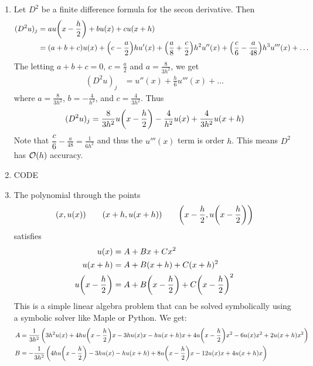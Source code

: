 \documentclass{article} %
\theoremstyle{plain}
\numberwithin{equation}{section} %
\numberwithin{figure}{section} %
\numberwithin{table}{section} %
\begin{document}
\begin{enumerate}[\ \ (a)]
    \item
        Let $D^2$ be a finite difference formula for the secon derivative.  Then
        \begin{align}
            (D^2u)_j &= au\qty(x - \frac{h}{2}) + bu\qty(x) + cu\qty(x + h) \\
            &= (a + b + c)u(x) + \qty(c - \frac{a}{2})hu'(x) + \qty(\frac{a}{8} + \frac{c}{2})h^2 u''(x) + \qty(\frac{c}{6} - \frac{a}{48})h^3u'''(x) + \dots
        \end{align}
        The letting $a + b + c = 0$, $c = \frac{a}{2}$ and $a = \frac{8}{3h^2}$, we get
        \begin{align}
            (D^2u)_j &= u''(x) + \frac{h}{6}u'''(x) + \dots
        \end{align}
        where $a = \frac{8}{3h^2}$, $b = -\frac{4}{h^2}$, and $c = \frac{4}{3h^2}$.  Thus
        \begin{align}
            (D^2 u)_j = \frac{8}{3h^2}u\qty(x - \frac{h}{2}) - \frac{4}{h^2}u(x) + \frac{4}{3h^2}u(x + h)
        \end{align}
        Note that $\dfrac{c}{6} - \frac{a}{48} = \frac{1}{6h^2}$ and thus the $u'''(x)$ term is order $h$.  This means $D^2$ has $\order{h}$ accuracy.
    \item
        {\color{red}CODE}
    \item
        The polynomial through the points
        \begin{align}
            (x,u(x)) \qquad (x + h, u(x+h)) \qquad \qty(x - \frac{h}{2}, u\qty(x - \frac{h}{2}))
        \end{align}
        satisfies
        \begin{align}
            u(x) &= A + Bx + Cx^2 \\
            u(x+h) &= A + B(x+h) + C(x+h)^2 \\
            u\qty(x - \frac{h}{2}) &= A + B\qty(x - \frac{h}{2}) + C\qty(x - \frac{h}{2})^2
        \end{align}
        This is a simple linear algebra problem that can be solved symbolically using a symbolic solver like Maple or Python.  We get:
        \begin{align}
            A &= \frac{1}{3 h^{2}} \left(3 h^{2} u(x) + 4 h u\qty(x - \frac{h}{2}) x - 3 h u(x) x - h u\qty(x + h) x + 4 u\qty(x - \frac{h}{2}) x^{2} - 6 u(x) x^{2} + 2 u\qty(x + h) x^{2}\right) \\
            B &= -\frac{1}{3 h^{2}} \left(4 h u\qty(x - \frac{h}{2}) - 3 h u(x) - h u\qty(x + h) + 8 u\qty(x - \frac{h}{2}) x - 12 u(x) x + 4 u\qty(x + h) x\right) \\

\end{align}
\end{enumerate}
\end{document}
